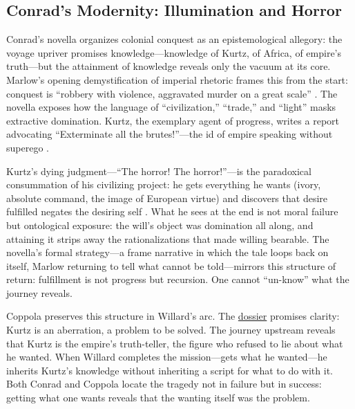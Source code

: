 \subsection*{Conrad's Modernity: Illumination and Horror}
\label{ssec:conrad-s-modernity-illumination-and-horror}
Conrad's novella organizes colonial conquest as an epistemological allegory: the voyage upriver
promises knowledge—knowledge of Kurtz, of Africa, of empire's truth—but the attainment of
knowledge reveals only the vacuum at its core. Marlow's opening demystification of imperial
rhetoric frames this from the start: conquest is ``robbery with violence, aggravated murder on
a great scale'' \parencite{ConradHOD1990}. The novella exposes how the language of
``civilization,'' ``trade,'' and ``light'' masks extractive domination. Kurtz, the exemplary
agent of progress, writes a report advocating ``Exterminate all the brutes!''—the id of empire
speaking without superego \parencite{ConradHOD1990}.

Kurtz's dying judgment---``The horror! The horror!''---is the paradoxical consummation of his
civilizing project: he gets everything he wants (ivory, absolute command, the image of European
virtue) and discovers that desire fulfilled negates the desiring self \parencite{ConradHOD1990}.
What he sees at the end is not moral failure but ontological exposure: the will's object was
domination all along, and attaining it strips away the rationalizations that made willing
bearable. The novella's formal strategy---a frame narrative in which the tale loops back on
itself, Marlow returning to tell what cannot be told—mirrors this structure of return:
fulfillment is not progress but recursion. One cannot ``un-know'' what the journey reveals.

Coppola preserves this structure in Willard's arc. The \hyperref[scene:briefing]{dossier}
promises clarity: Kurtz is an aberration, a problem to be solved. The journey upstream reveals
that Kurtz is the empire's truth-teller, the figure who refused to lie about what he wanted.
When Willard completes the mission—gets what he wanted—he inherits Kurtz's knowledge without
inheriting a script for what
to do with it. Both Conrad and Coppola locate the tragedy not in failure but in success:
getting what one wants reveals that the wanting itself was the problem.
